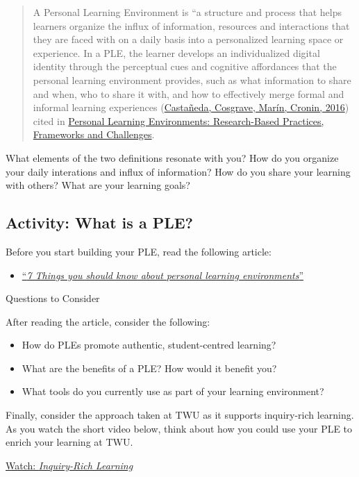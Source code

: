\documentclass[
]{book}
\providecommand{\tightlist}{%
  \setlength{\itemsep}{0pt}\setlength{\parskip}{0pt}}
\theoremstyle{definition}
\theoremstyle{definition}
\theoremstyle{definition}
\theoremstyle{definition}
\theoremstyle{remark}
\begin{document}
\begin{quote}
A Personal Learning Environment is ``a structure and process that helps learners organize the influx of information, resources and interactions that they are faced with on a daily basis into a personalized learning space or experience. In a PLE, the learner develops an individualized digital identity through the perceptual cues and cognitive affordances that the personal learning environment provides, such as what information to share and when, who to share it with, and how to effectively merge formal and informal learning experiences (\href{https://naerjournal.ua.es/article/view/v6n1-introduction\#}{Castañeda, Cosgrave, Marín, Cronin, 2016}) cited in \href{https://naerjournal.ua.es/article/view/v6n1-introduction}{Personal Learning Environments: Research-Based Practices, Frameworks and Challenges}.
\end{quote}

What elements of the two definitions resonate with you? How do you organize your daily interations and influx of information? How do you share your learning with others? What are your learning goals?

\hypertarget{activity-what-is-a-ple}{%
\subsection*{Activity: What is a PLE?}\label{activity-what-is-a-ple}}

\begin{reflect}
Before you start building your PLE, read the following article:

\begin{itemize}
\tightlist
\item
  \href{assets/u4/U4_7-things-you-should-know-about-PLNs.pdf}{``\emph{7 Things you should know about personal learning environments}''}
\end{itemize}

{Questions to Consider}

After reading the article, consider the following:

\begin{itemize}
\tightlist
\item
  How do PLEs promote authentic, student-centred learning?\\
\item
  What are the benefits of a PLE? How would it benefit you?\\
\item
  What tools do you currently use as part of your learning environment?
\end{itemize}

Finally, consider the approach taken at TWU as it supports inquiry-rich learning. As you watch the short video below, think about how you could use your PLE to enrich your learning at TWU.

\href{https://www.youtube.com/watch?v=SCa9Nt3X1vU}{Watch: \emph{Inquiry-Rich Learning}}
\end{reflect}
\end{document}
